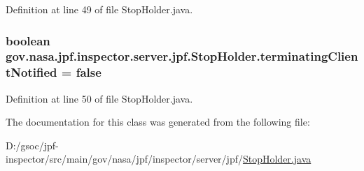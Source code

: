Definition at line 49 of file Stop\+Holder.\+java.

\subsubsection[{\texorpdfstring{terminating\+Client\+Notified}{terminatingClientNotified}}]{\setlength{\rightskip}{0pt plus 5cm}boolean gov.\+nasa.\+jpf.\+inspector.\+server.\+jpf.\+Stop\+Holder.\+terminating\+Client\+Notified = false\hspace{0.3cm}{\ttfamily [private]}}\hypertarget{classgov_1_1nasa_1_1jpf_1_1inspector_1_1server_1_1jpf_1_1_stop_holder_adacbde9669c7c438d8768d5b5f426715}{}\label{classgov_1_1nasa_1_1jpf_1_1inspector_1_1server_1_1jpf_1_1_stop_holder_adacbde9669c7c438d8768d5b5f426715}


Definition at line 50 of file Stop\+Holder.\+java.



The documentation for this class was generated from the following file\+:\begin{DoxyCompactItemize}
\item 
D\+:/gsoc/jpf-\/inspector/src/main/gov/nasa/jpf/inspector/server/jpf/\hyperlink{_stop_holder_8java}{Stop\+Holder.\+java}\end{DoxyCompactItemize}
